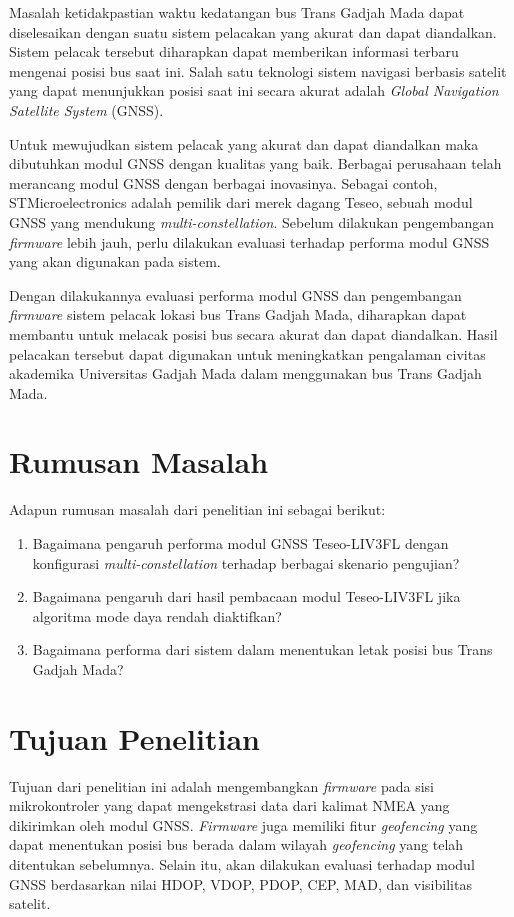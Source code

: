 Masalah ketidakpastian waktu kedatangan bus Trans Gadjah Mada dapat diselesaikan dengan suatu sistem pelacakan yang akurat dan dapat diandalkan. Sistem pelacak tersebut diharapkan dapat memberikan informasi terbaru mengenai posisi bus saat ini. Salah satu teknologi sistem navigasi berbasis satelit yang dapat menunjukkan posisi saat ini secara akurat adalah \textit{Global Navigation Satellite System} (GNSS).

Untuk mewujudkan sistem pelacak yang akurat dan dapat diandalkan maka dibutuhkan modul GNSS dengan kualitas yang baik. Berbagai perusahaan telah merancang modul GNSS dengan berbagai inovasinya. Sebagai contoh, STMicroelectronics adalah pemilik dari merek dagang Teseo, sebuah modul GNSS yang mendukung \textit{multi-constellation}. Sebelum dilakukan pengembangan \textit{firmware} lebih jauh, perlu dilakukan evaluasi terhadap performa modul GNSS yang akan digunakan pada sistem.

Dengan dilakukannya evaluasi performa modul GNSS dan pengembangan \textit{firmware} sistem pelacak lokasi bus Trans Gadjah Mada, diharapkan dapat membantu untuk melacak posisi bus secara akurat dan dapat diandalkan. Hasil pelacakan tersebut dapat digunakan untuk meningkatkan pengalaman civitas akademika Universitas Gadjah Mada dalam menggunakan bus Trans Gadjah Mada.

\section{Rumusan Masalah}
Adapun rumusan masalah dari penelitian ini sebagai berikut:
\begin{enumerate}
	\item Bagaimana pengaruh performa modul GNSS Teseo\hyp{}LIV3FL dengan konfigurasi \textit{multi-constellation} terhadap berbagai skenario pengujian?
	\item Bagaimana pengaruh dari hasil pembacaan modul Teseo\hyp{}LIV3FL jika algoritma mode daya rendah diaktifkan?
	\item Bagaimana performa dari sistem dalam menentukan letak posisi bus Trans Gadjah Mada?
\end{enumerate}

\section{Tujuan Penelitian}
Tujuan dari penelitian ini adalah mengembangkan \textit{firmware} pada sisi mikrokontroler yang dapat mengekstrasi data dari kalimat NMEA yang dikirimkan oleh modul GNSS. \textit{Firmware} juga memiliki fitur \textit{geofencing} yang dapat menentukan posisi bus berada dalam wilayah \textit{geofencing} yang telah ditentukan sebelumnya. Selain itu, akan dilakukan evaluasi terhadap modul GNSS berdasarkan nilai HDOP, VDOP, PDOP, CEP, MAD, dan visibilitas satelit.

